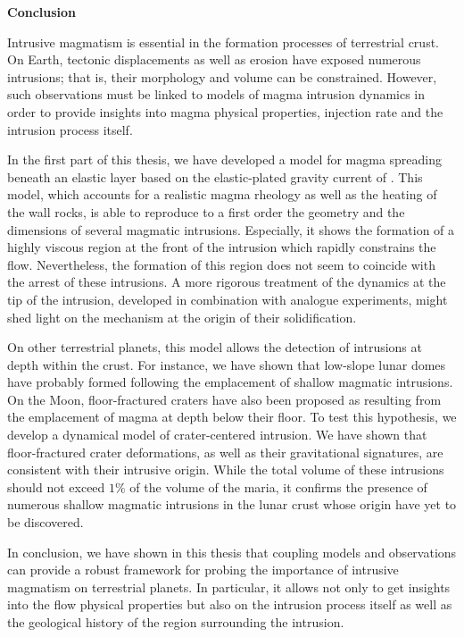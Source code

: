 \thispagestyle{plain}
\begin{center}
 \Large \vspace{.5cm} \textbf{Conclusion}
\end{center}

Intrusive  magmatism  is  essential  in  the  formation  processes  of
terrestrial crust. On Earth, tectonic displacements as well as erosion
have exposed numerous intrusions; that is, their morphology and volume
can  be constrained.   However, such  observations must  be linked  to
models of magma  intrusion dynamics in order to  provide insights into
magma physical  properties, injection  rate and the  intrusion process
itself.

In the first part of this thesis,  we have developed a model for magma
spreading beneath an elastic layer based on the elastic-plated gravity
current of  \citet{Michaut:2011kg}.  This model, which  accounts for a
realistic magma rheology as well as  the heating of the wall rocks, is
able to reproduce to a first  order the geometry and the dimensions of
several magmatic intrusions.  Especially, it  shows the formation of a
highly  viscous region  at the  front of  the intrusion  which rapidly
constrains the flow.   Nevertheless, the formation of  this region does
not seem  to coincide  with the  arrest of  these intrusions.   A more
rigorous  treatment of  the  dynamics  at the  tip  of the  intrusion,
developed in  combination with analogue experiments,  might shed light
on the mechanism at the origin of their solidification.

On  other terrestrial  planets,  this model  allows  the detection  of
intrusions at  depth within  the crust.  For  instance, we  have shown
that  low-slope  lunar  domes   have  probably  formed  following  the
emplacement   of   shallow   magmatic  intrusions.    On   the   Moon,
floor-fractured craters have also been  proposed as resulting from the
emplacement  of  magma at  depth  below  their  floor.  To  test  this
hypothesis, we develop a dynamical model of crater-centered intrusion.
We have  shown that  floor-fractured crater  deformations, as  well as
their gravitational  signatures, are  consistent with  their intrusive
origin.  While the total volume  of these intrusions should not exceed
$1\%$ of the volume of the maria, it confirms the presence of numerous
shallow magmatic intrusions  in the lunar crust whose  origin have yet
to be discovered.

In conclusion, we  have shown in this thesis that  coupling models and
observations can provide a robust framework for probing the importance
of  intrusive magmatism  on  terrestrial planets.   In particular,  it
allows not only to get insights  into the flow physical properties but
also on the intrusion process itself as well as the geological history
of the region surrounding the intrusion.


\clearpage

